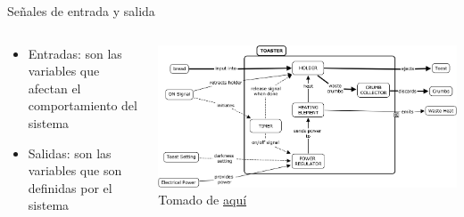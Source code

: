 \documentclass[aspectratio=169]{beamer}
\begin{document}
\begin{frame}{Señales de entrada y salida}
    \begin{columns}[c, onlytextwidth]
        \begin{column}{0.4\textwidth}
             \begin{itemize}
                \item Entradas: son las variables que afectan el comportamiento del sistema
                \item Salidas: son las variables que son definidas por el sistema
             \end{itemize}
        \end{column}
        \begin{column}{0.6\textwidth}
            \begin{center}
               \includegraphics[width=\textwidth]{fig/tostadora.jpg}\\
               \tiny{Tomado de \href{https://deseng.ryerson.ca/dokuwiki/_detail/design:toasterarchitecture.jpg?id=design\%3Asystem_diagram}{aquí}}
            \end{center}
        \end{column}
    \end{columns}
\end{frame}
\end{document}
